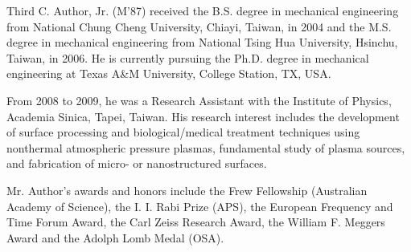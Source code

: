 \documentclass{ieeeaccess}
\begin{document}
\newpage


\begin{IEEEbiographynophoto}{Third C. Author, Jr.} (M'87) received the B.S. degree in mechanical
engineering from National Chung Cheng University, Chiayi, Taiwan, in 2004
and the M.S. degree in mechanical engineering from National Tsing Hua
University, Hsinchu, Taiwan, in 2006. He is currently pursuing the Ph.D.
degree in mechanical engineering at Texas A{\&}M University, College
Station, TX, USA.

From 2008 to 2009, he was a Research Assistant with the Institute of
Physics, Academia Sinica, Tapei, Taiwan. His research interest includes the
development of surface processing and biological/medical treatment
techniques using nonthermal atmospheric pressure plasmas, fundamental study
of plasma sources, and fabrication of micro- or nanostructured surfaces.

Mr. Author's awards and honors include the Frew Fellowship (Australian
Academy of Science), the I. I. Rabi Prize (APS), the European Frequency and
Time Forum Award, the Carl Zeiss Research Award, the William F. Meggers
Award and the Adolph Lomb Medal (OSA).
\end{IEEEbiographynophoto}

\EOD
\end{document}
